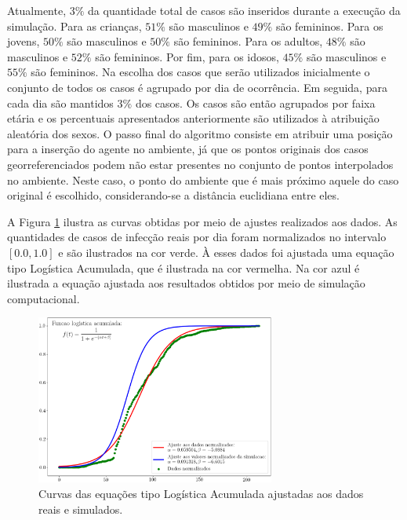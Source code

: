 Atualmente, $3\%$ da quantidade total de casos são inseridos durante a execução da simulação. Para as crianças, $51\%$ são masculinos e $49\%$ são femininos. Para os jovens, $50\%$ são masculinos e $50\%$ são femininos. Para os adultos, $48\%$ são masculinos e $52\%$ são femininos. Por fim, para os idosos, $45\%$ são masculinos e $55\%$ são femininos. Na escolha dos casos que serão utilizados inicialmente o conjunto de todos os casos é agrupado por dia de ocorrência. Em seguida, para cada dia são mantidos $3\%$ dos casos. Os casos são então agrupados por faixa etária e os percentuais apresentados anteriormente são utilizados à atribuição aleatória dos sexos. O passo final do algoritmo consiste em atribuir uma posição para a inserção do agente no ambiente, já que os pontos originais dos casos georreferenciados podem não estar presentes no conjunto de pontos interpolados no ambiente. Neste caso, o ponto do ambiente que é mais próximo aquele do caso original é escolhido, considerando-se a distância euclidiana entre eles. 

A Figura \ref{fig:funcoes_logistica} ilustra as curvas obtidas por meio de ajustes realizados aos dados. As quantidades de casos de infecção reais por dia foram normalizados no intervalo $[0.0, 1.0]$ e são ilustrados na cor verde. À esses dados foi ajustada uma equação tipo Logística Acumulada, que é ilustrada na cor vermelha. Na cor azul é ilustrada a equação ajustada aos resultados obtidos por meio de simulação computacional. 

\begin{figure}[H]
  \centering
  \includegraphics[width=0.7\textwidth]{Figuras/TratamentosDados/Logistica.png}
  \caption{Curvas das equações tipo Logística Acumulada ajustadas aos dados reais e simulados. }
  \label{fig:funcoes_logistica}
\end{figure} 

\newpage